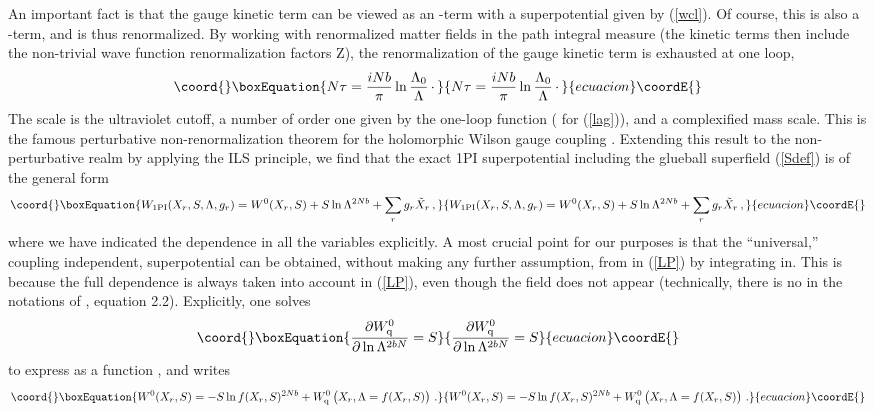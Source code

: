 \documentclass[a4paper,12pt]{article}
\begin{document}
An important fact is that the gauge kinetic term 
can be viewed as an \coordHE{}-term with a superpotential given by 
(\ref{wcl}). Of course, this is also a \coordHE{}-term, and is thus renormalized. 
By working with renormalized matter fields
in the path integral measure (the kinetic terms then include
the non-trivial wave function renormalization factors Z), the 
renormalization of the gauge kinetic term is exhausted at one loop,
%
\begin{equation}\coord{}\boxEquation{
\label{tauren}
N\tau = {iNb\over\pi}\ln {\L_{0}\over\L}\,\cdotp
}{
N\tau = {iNb\over\pi}\ln {\L_{0}\over\L}\,\cdotp
}{ecuacion}\coordE{}\end{equation}
%
The scale \coordHE{} is the ultraviolet cutoff, \coordHE{} a number of order
one given by the one-loop \myHighlight{$\beta$}\coordHE{} function (\coordHE{} for (\ref{lag})),
and \myHighlight{$\L$}\coordHE{} a complexified mass scale. This is the famous perturbative
non-renormalization theorem for the holomorphic Wilson gauge coupling
\cite{SV}. Extending this result to the non-perturbative realm by
applying the ILS principle, we find that the exact 1PI superpotential
including the glueball superfield (\ref{Sdef}) is of the general form
%
\begin{equation}\coord{}\boxEquation{
\label{WeffS}
W_{\rm 1PI} (X_{r},S,\L,g_{r}) = W^{0}(X_{r},S) + S\ln
\L^{2Nb} + \sum_{r}g_{r}\tilde X_{r}\, ,
}{
W_{\rm 1PI} (X_{r},S,\L,g_{r}) = W^{0}(X_{r},S) + S\ln
\L^{2Nb} + \sum_{r}g_{r}\tilde X_{r}\, ,
}{ecuacion}\coordE{}\end{equation}
%
where we have indicated the dependence in all the variables explicitly. A
most crucial point for our purposes
is that the ``universal,'' coupling independent,
superpotential \coordHE{} can be obtained, without making any further
assumption, from \coordHE{} in (\ref{LP}) by integrating in. This is
because the full \myHighlight{$\L$}\coordHE{} dependence is always taken into account in
(\ref{LP}), even though the \coordHE{} field does not appear (technically,
there is no \coordHE{} in the notations of \cite{ken}, equation 2.2).
Explicitly, one solves
%
\begin{equation}\coord{}\boxEquation{
\label{Seq}
{\partial\wq^{0}\over\partial\ln\L^{2bN}} = S
}{
{\partial\wq^{0}\over\partial\ln\L^{2bN}} = S
}{ecuacion}\coordE{}\end{equation}
%
to express \myHighlight{$\L$}\coordHE{} as a function \coordHE{}, and writes
%
\begin{equation}\coord{}\boxEquation{
\label{W0}
W^{0}(X_{r},S) = -S\ln f(X_{r},S)^{2Nb} + 
\wq^{0}\left(\strut X_{r},\L = f(X_{r},S)\right)\, .
}{
W^{0}(X_{r},S) = -S\ln f(X_{r},S)^{2Nb} + 
\wq^{0}\left(\strut X_{r},\L = f(X_{r},S)\right)\, .
}{ecuacion}\coordE{}\end{equation}
%
\end{document}
